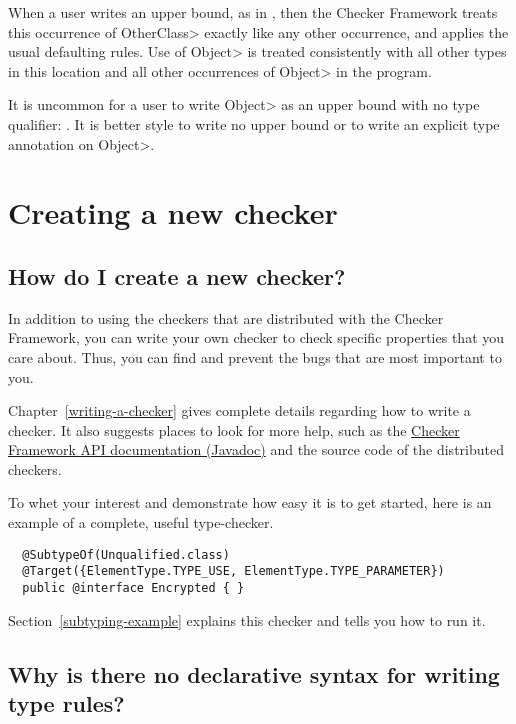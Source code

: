 When a user writes an upper bound, as in
,
then the Checker Framework treats this occurrence of \<OtherClass> exactly
like any other occurrence, and applies the usual defaulting rules.  Use of
\<Object> is treated consistently with all other types in this location and
all other occurrences of \<Object> in the program.

It is uncommon for a user to write \<Object> as an upper bound with no type
qualifier:
.
It is better style to write no upper bound or to write an explicit type
annotation on \<Object>.


\section{Creating a new checker\label{faq-create-a-checker-section}}

\subsection{How do I create a new checker?\label{faq-create-a-checker}}

In addition to using the checkers that are distributed with the Checker
Framework, you can write your own checker to check specific properties that
you care about.  Thus, you can find and prevent the bugs that are most
important to you.

Chapter~\ref{writing-a-checker} gives
complete details regarding how to write a checker.  It also suggests places
to look for more help, such as the \href{api/}{Checker Framework
API documentation (Javadoc)} and the source code of the distributed
checkers.

To whet your interest and demonstrate how easy it is to get started, here
is an example of a complete, useful type-checker.

\begin{Verbatim}
  @SubtypeOf(Unqualified.class)
  @Target({ElementType.TYPE_USE, ElementType.TYPE_PARAMETER})
  public @interface Encrypted { }
\end{Verbatim}

Section~\ref{subtyping-example} explains this checker and tells
you how to run it.


\subsection{Why is there no declarative syntax for writing type rules?\label{faq-declarative-syntax-for-type-rules}}

